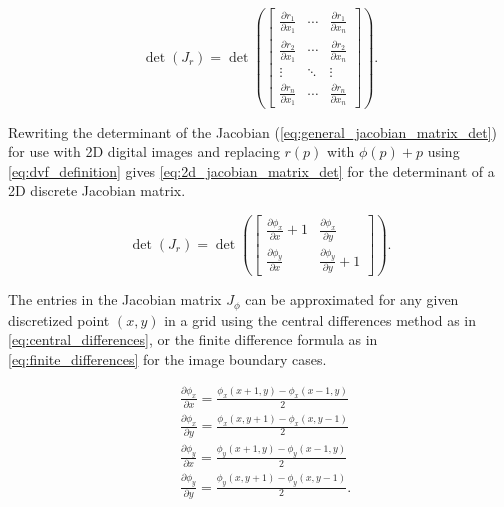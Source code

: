 \documentclass[lettersize,journal]{IEEEtran}
\begin{document}
\begin{equation} \label{eq:general_jacobian_matrix_det}
    \det(J_r) = 
    \det\left( 
        \begin{bmatrix}
            \frac{\partial r_1}{\partial x_1} & \cdots & \frac{\partial r_1}{\partial x_n} \\
            \frac{\partial r_2}{\partial x_1} & \cdots & \frac{\partial r_2}{\partial x_n} \\
            \vdots & \ddots & \vdots \\
            \frac{\partial r_n}{\partial x_1} & \cdots & \frac{\partial r_n}{\partial x_n}
        \end{bmatrix}
    \right).
\end{equation}

Rewriting the determinant of the Jacobian (\autoref{eq:general_jacobian_matrix_det}) for use with 2D digital images and replacing $r(p)$ with $\phi(p)+p$ using \autoref{eq:dvf_definition} gives \autoref{eq:2d_jacobian_matrix_det} for the determinant of a 2D discrete Jacobian matrix.

\begin{equation} \label{eq:2d_jacobian_matrix_det}
    \det(J_{r}) = 
    \det\left( 
    \begin{bmatrix}
    \frac{\partial \phi_x}{\partial x} + 1 & \frac{\partial \phi_x}{\partial y} \\
    \frac{\partial \phi_y}{\partial x} & \frac{\partial \phi_y}{\partial y} + 1
    \end{bmatrix}
    \right).
\end{equation}

The entries in the Jacobian matrix $J_{\phi}$ can be approximated for any given discretized point $(x, y)$ in a grid using the central differences method as in \autoref{eq:central_differences}, or the finite difference formula as in \autoref{eq:finite_differences} for the image boundary cases.

\begin{equation} \label{eq:central_differences}
    \begin{aligned}
        & \frac{\partial \phi_x}{\partial x} = \frac{\phi_x(x + 1, y) - \phi_x(x - 1, y)}{2} \\
        & \frac{\partial \phi_x}{\partial y} = \frac{\phi_x(x, y + 1) - \phi_x(x, y - 1)}{2} \\
        & \frac{\partial \phi_y}{\partial x} = \frac{\phi_y(x + 1, y) - \phi_y(x - 1, y)}{2} \\
        & \frac{\partial \phi_y}{\partial y} = \frac{\phi_y(x, y + 1) - \phi_y(x, y - 1)}{2}. \\
    \end{aligned}
\end{equation}
\end{document}
